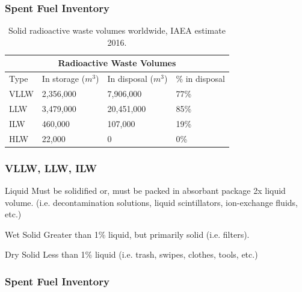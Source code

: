 

\begin{frame}[fragile]
        \frametitle{Spent Fuel Inventory}
    \begin{table}
      \centering
      \begin{tabular}{l|lll}
        \multicolumn{4}{c}{\textbf{Radioactive Waste Volumes}}\\
        \hline
Type & In storage ($m^3$) & In disposal ($m^3$)  &  \% in disposal\\
        \hline
VLLW &   2,356,000 &   7,906,000  &  77\%\\
LLW  &  3,479,000  &  20,451,000 &   85\%\\
ILW  &  460,000  &  107,000  &  19\%\\
HLW  &  22,000 &   0   & 0\%\\
        \hline
      \end{tabular}
      \caption[SNF volumes]{Solid radioactive waste volumes worldwide, IAEA 
      estimate 2016. \cite{iaea}}
      \label{tab:vol}
    \end{table}
    \end{frame}

\begin{frame}[fragile]
        \frametitle{VLLW, LLW, ILW}
        \begin{block}{Liquid}
                Must be solidified or, must be packed in absorbant package 2x liquid volume.
                (i.e. decontamination solutions, liquid scintillators, 
                ion-exchange fluids, etc.)
        \end{block}
        \begin{block}{Wet Solid}
                Greater than 1\% liquid, but primarily solid (i.e. filters).
        \end{block}
        \begin{block}{Dry Solid}
                        Less than 1\% liquid (i.e. trash, swipes, clothes, 
                        tools, etc.)
        \end{block}
\end{frame}

\begin{frame}[fragile]
        \frametitle{Spent Fuel Inventory}
                
\end{frame}

